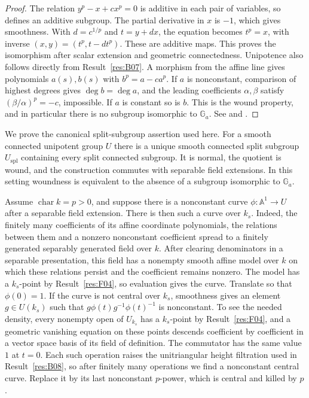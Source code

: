 \documentclass[11pt,a4paper,openany,oneside]{book}
\theoremstyle{resultstyle}
\theoremstyle{definition}
\numberwithin{equation}{chapter}
\begin{document}
\begin{proof}
The relation \(y^p-x+cx^p=0\) is additive in each pair of variables,
so defines an additive subgroup. The partial derivative in \(x\)
is \(-1\), which gives smoothness. With \(d=c^{1/p}\) and
\(t=y+dx\), the equation becomes \(t^p=x\), with inverse
\((x,y)=(t^p,t-dt^p)\). These are additive maps. This proves the
isomorphism after scalar extension and geometric connectedness.
Unipotence also follows directly from Result~\ref{res:B07}.
A morphism from the affine line gives polynomials \(a(s),b(s)\)
with \(b^p=a-ca^p\). If \(a\) is nonconstant, comparison of highest
degrees gives \(\deg b=\deg a\), and the leading coefficients
\(\alpha,\beta\) satisfy \((\beta/\alpha)^p=-c\), impossible.
If \(a\) is constant so is \(b\). This is the wound property, and
in particular there is no subgroup isomorphic to \(\mathbb G_a\).
See \cite[14.69--14.75]{milne} and
\cite[Examples 5.2.7, 5.2.9 and Definition 5.2.8]{conradfeng}.
\end{proof}

We prove the canonical split-subgroup assertion used here. For a
smooth connected unipotent group \(U\) there is a unique smooth
connected split subgroup \(U_{\mathrm{spl}}\) containing every
split connected subgroup. It is normal, the quotient is wound,
and the construction commutes with separable field extensions.
In this setting woundness is equivalent to the absence of a
subgroup isomorphic to \(\mathbb G_a\).

Assume \(\operatorname{char}k=p>0\), and suppose there is a
nonconstant curve \(\phi:\mathbb A^1\to U\) after a separable field
extension. There is then such a curve over \(k_s\). Indeed, the
finitely many coefficients of its affine coordinate polynomials,
the relations between them and a nonzero nonconstant coefficient
spread to a finitely generated separably generated field over
\(k\). After clearing denominators in a separable presentation,
this field has a nonempty smooth affine model over \(k\) on
which these relations persist and the coefficient remains
nonzero. The model has a \(k_s\)-point by
Result~\ref{res:F04}, so evaluation gives the curve. Translate
so that \(\phi(0)=1\). If the curve is not central over \(k_s\),
smoothness gives an element \(g\in U(k_s)\) such that
\(g\phi(t)g^{-1}\phi(t)^{-1}\) is nonconstant. To see the needed
density, every nonempty open of \(U_{k_s}\) has a \(k_s\)-point
by Result~\ref{res:F04}, and a geometric vanishing equation on
these points descends coefficient by coefficient in a vector
space basis of its field of definition. The commutator has the
same value \(1\) at \(t=0\). Each such operation raises the
unitriangular height filtration used in Result~\ref{res:B08},
so after finitely many operations we find a nonconstant
central curve. Replace it by its last nonconstant \(p\)-power,
which is central and killed by \(p\).
\end{document}

